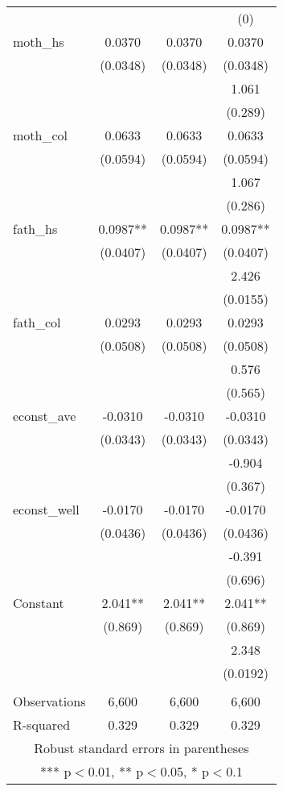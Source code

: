 \begin{tabular}{lccc}
 &  &  & (0) \\
moth\_hs & 0.0370 & 0.0370 & 0.0370 \\
 & (0.0348) & (0.0348) & (0.0348) \\
 &  &  & 1.061 \\
 &  &  & (0.289) \\
moth\_col & 0.0633 & 0.0633 & 0.0633 \\
 & (0.0594) & (0.0594) & (0.0594) \\
 &  &  & 1.067 \\
 &  &  & (0.286) \\
fath\_hs & 0.0987** & 0.0987** & 0.0987** \\
 & (0.0407) & (0.0407) & (0.0407) \\
 &  &  & 2.426 \\
 &  &  & (0.0155) \\
fath\_col & 0.0293 & 0.0293 & 0.0293 \\
 & (0.0508) & (0.0508) & (0.0508) \\
 &  &  & 0.576 \\
 &  &  & (0.565) \\
econst\_ave & -0.0310 & -0.0310 & -0.0310 \\
 & (0.0343) & (0.0343) & (0.0343) \\
 &  &  & -0.904 \\
 &  &  & (0.367) \\
econst\_well & -0.0170 & -0.0170 & -0.0170 \\
 & (0.0436) & (0.0436) & (0.0436) \\
 &  &  & -0.391 \\
 &  &  & (0.696) \\
Constant & 2.041** & 2.041** & 2.041** \\
 & (0.869) & (0.869) & (0.869) \\
 &  &  & 2.348 \\
 &  &  & (0.0192) \\
 &  &  &  \\
Observations & 6,600 & 6,600 & 6,600 \\
 R-squared & 0.329 & 0.329 & 0.329 \\ \hline
\multicolumn{4}{c}{ Robust standard errors in parentheses} \\
\multicolumn{4}{c}{ *** p$<$0.01, ** p$<$0.05, * p$<$0.1} \\
\end{tabular}
